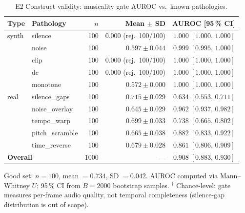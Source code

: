 \begin{table}[ht]
\centering
\caption{E2 Construct validity: musicality gate AUROC vs.\ known pathologies.}
\label{tab:e2-construct-validity}
\begin{tabular}{llrrr}
\toprule
Type & Pathology & $n$ & Mean $\pm$ SD & AUROC [95\,\% CI] \\
\midrule
synth & silence & 100 & $0.000$ (rej.\ 100/100) & $1.000\;[1.000,\,1.000]$ \\
 & noise & 100 & $0.597 \pm 0.044$ & $0.999\;[0.995,\,1.000]$ \\
 & clip & 100 & $0.000$ (rej.\ 100/100) & $1.000\;[1.000,\,1.000]$ \\
 & dc & 100 & $0.000$ (rej.\ 100/100) & $1.000\;[1.000,\,1.000]$ \\
 & monotone & 100 & $0.572 \pm 0.000$ & $1.000\;[1.000,\,1.000]$ \\
real & silence_gaps & 100 & $0.715 \pm 0.029$ & $0.634\;[0.553,\,0.711]$ \\
 & noise_overlay & 100 & $0.645 \pm 0.029$ & $0.962\;[0.937,\,0.982]$ \\
 & tempo_warp & 100 & $0.699 \pm 0.033$ & $0.738\;[0.665,\,0.802]$ \\
 & pitch_scramble & 100 & $0.665 \pm 0.038$ & $0.882\;[0.833,\,0.922]$ \\
 & time_reverse & 100 & $0.679 \pm 0.028$ & $0.861\;[0.806,\,0.909]$ \\
\midrule
\multicolumn{2}{l}{\textbf{Overall}} & 1000 & --- & $\mathbf{0.908}\;[0.883,\,0.930]$ \\
\bottomrule
\end{tabular}
\begin{tablenotes}
\small
Good set: $n=100$, mean $= 0.734$, SD $= 0.042$. AUROC computed via Mann–Whitney $U$; 95\,\% CI from $B=2000$ bootstrap samples. $^\dagger$ Chance-level: gate measures per-frame audio quality, not temporal completeness (silence-gap distribution is out of scope).
\end{tablenotes}
\end{table}